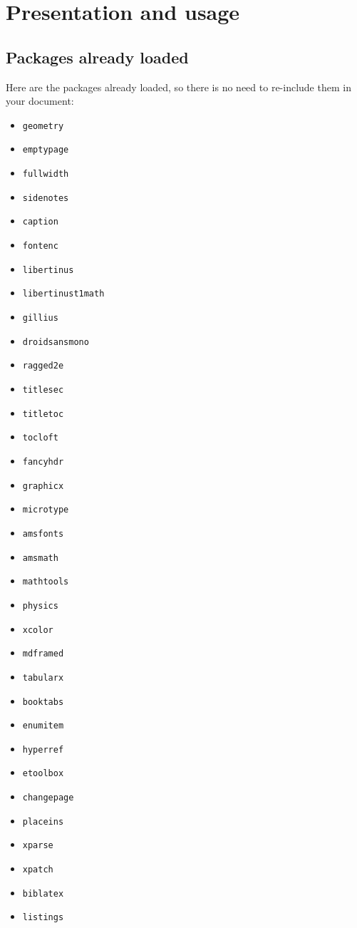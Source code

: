 \documentclass[
	raggedright,
	twoside,
	12pt,
	colorful,
]{tufte-style-article}
\begin{document}
\newpage
\section{Presentation and usage}

\subsection{Packages already loaded}

Here are the packages already loaded, so there is no need to re-include them in your document:

\begin{wide}
\begin{multicols}{4}
\begin{itemize}
\item\texttt{geometry}
\item\texttt{emptypage}
\item\texttt{fullwidth}
\item\texttt{sidenotes}
\item\texttt{caption}
\item\texttt{fontenc}
\item\texttt{libertinus}
\item\texttt{libertinust1math}
\item\texttt{gillius}
\item\texttt{droidsansmono}
\item\texttt{ragged2e}
\item\texttt{titlesec}
\item\texttt{titletoc}
\item\texttt{tocloft}
\item\texttt{fancyhdr}
\item\texttt{graphicx} \item\texttt{microtype} \item\texttt{amsfonts} \item\texttt{amsmath} \item\texttt{mathtools} \item\texttt{physics} \item\texttt{xcolor} \item\texttt{mdframed} \item\texttt{tabularx} \item\texttt{booktabs} \item\texttt{enumitem} \item\texttt{hyperref} \item\texttt{etoolbox} \item\texttt{changepage} \item\texttt{placeins} \item\texttt{xparse} \item\texttt{xpatch} \item\texttt{biblatex} \item\texttt{listings}
\end{itemize}
\end{multicols}
\end{wide}
\end{document}
